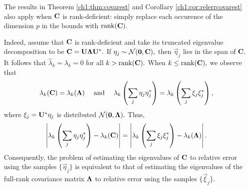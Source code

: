 
\begin{remark}
The results in Theorem \ref{ch1:thm:covarest} and Corollary \ref{ch1:cor:relerrcovarest}
also apply when $\mathbf{C}$ is rank-deficient: simply replace each occurence of
the dimension $p$ in the bounds with $\mathrm{rank}(\mathbf{C}).$ 

Indeed, assume that $\mathbf{C}$ is rank-deficient and take its truncated
eigenvalue decomposition to be $\mathbf{C} = \mathbf{U} \mathbf{\Lambda} \mathbf{U}^*.$
If $\mathbf{\eta}_j \sim \mathcal{N}(\mathbf{0}, \mathbf{C}),$ then $\vec{\eta}_j$ lies
in the span of $\mathbf{C}.$ It follows that $\hat{\lambda}_k = \lambda_k = 0$ for
all $k > \mathrm{rank}(\mathbf{C}).$ When $k \leq \mathrm{rank}(\mathbf{C}),$ we observe that  
\[
\lambda_k(\mathbf{C}) = \lambda_k(\mathbf{\Lambda}) \quad \text{ and } \quad
\lambda_k\left(\sum_j \mathbf{\eta}_j \mathbf{\eta}_j^* \right) = \lambda_k\left(
\sum_j \mathbf{\xi}_j \mathbf{\xi}_j^* \right),
\]
where $\mathbf{\xi}_j = \mathbf{U}^* \mathbf{\eta}_j$ is distributed
$\mathcal{N}(\mathbf{0}, \mathbf{\Lambda}).$ Thus,
\[
\left| \lambda_k\left(\sum_j \mathbf{\eta}_j \mathbf{\eta}_j^* \right) -
\lambda_k(\mathbf{C}) \right| =
\left| \lambda_k\left( \sum_j \mathbf{\xi}_j \mathbf{\xi}_j^* \right) -
\lambda_k(\mathbf{\Lambda}) \right|.
\]
Consequently, the problem of estimating the eigenvalues of $\mathbf{C}$ to relative
error using the samples $\{\vec{\eta}_j\}$ is equivalent to that of estimating
the eigenvalues of the full-rank covariance matrix $\mathbf{\Lambda}$ to relative
error using the samples $\{\vec{\xi}_j\}.$
\end{remark}
% 
% 
% 

